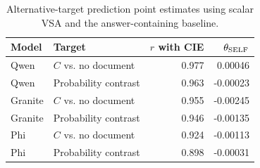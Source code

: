 \begin{table}[!htbp]
\centering\small
\caption{Alternative-target prediction point estimates using scalar VSA and the answer-containing baseline.}
\label{tab:alternative_targets}
\renewcommand{\arraystretch}{1.25}
\begin{tabular}{@{}llrr@{}}
\toprule
Model & Target & $r$ with CIE & $\theta_{\rm SELF}$\\
\midrule
Qwen & $C$ vs. no document & 0.977 & 0.00046\\
Qwen & Probability contrast & 0.963 & -0.00023\\
Granite & $C$ vs. no document & 0.955 & -0.00245\\
Granite & Probability contrast & 0.946 & -0.00135\\
Phi & $C$ vs. no document & 0.924 & -0.00113\\
Phi & Probability contrast & 0.898 & -0.00031\\
\bottomrule
\end{tabular}
\end{table}
